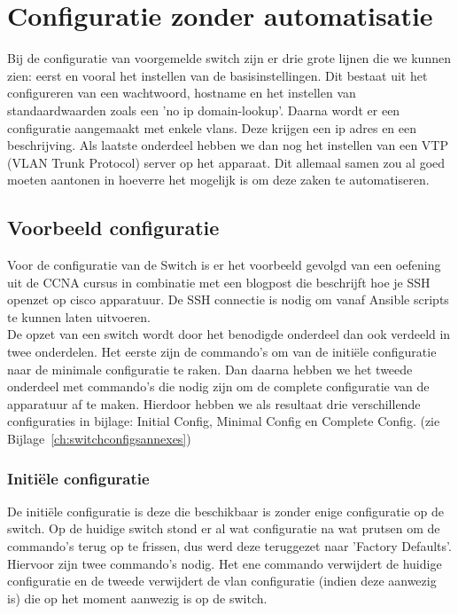 
\chapter{Configuratie zonder automatisatie}
\label{ch:configuratie}

Bij de configuratie van voorgemelde switch zijn er drie grote lijnen die we kunnen zien: eerst en vooral het instellen van de basisinstellingen. Dit bestaat uit het configureren van een wachtwoord, hostname en het instellen van standaardwaarden zoals een 'no ip domain-lookup'.
Daarna wordt er een configuratie aangemaakt met enkele vlans. Deze krijgen een ip adres en een beschrijving. Als laatste onderdeel hebben we dan nog het instellen van een VTP (VLAN Trunk Protocol) server op het apparaat. Dit allemaal samen zou al goed moeten aantonen in hoeverre het mogelijk is om deze zaken te automatiseren.

\section{Voorbeeld configuratie}
\label{sec:voorbeeld}
Voor de configuratie van de Switch is er het voorbeeld gevolgd van een oefening uit de CCNA cursus in combinatie met een blogpost die beschrijft hoe je SSH openzet op cisco apparatuur. De SSH connectie is nodig om vanaf Ansible scripts te kunnen laten uitvoeren. \autocite{ciscoSSH}
\\

De opzet van een switch wordt door het benodigde onderdeel dan ook verdeeld in twee onderdelen. Het eerste zijn de commando's om van de initiële configuratie naar de minimale configuratie te raken. Dan daarna hebben we het tweede onderdeel met commando's die nodig zijn om de complete configuratie van de apparatuur af te maken. Hierdoor hebben we als resultaat drie verschillende configuraties in bijlage: Initial Config, Minimal Config en Complete Config. (zie Bijlage~\ref{ch:switchconfigsannexes})

\subsection{Initiële configuratie}
\label{sec:initiële configuratie}
De initiële configuratie is deze die beschikbaar is zonder enige configuratie op de switch. Op de huidige switch stond er al wat configuratie na wat prutsen om de commando's terug op te frissen, dus werd deze teruggezet naar 'Factory Defaults'. Hiervoor zijn twee commando's nodig. Het ene commando verwijdert de huidige configuratie en de tweede verwijdert de vlan configuratie (indien deze aanwezig is) die op het moment aanwezig is op de switch. \autocite{resetSwitch}
\\

